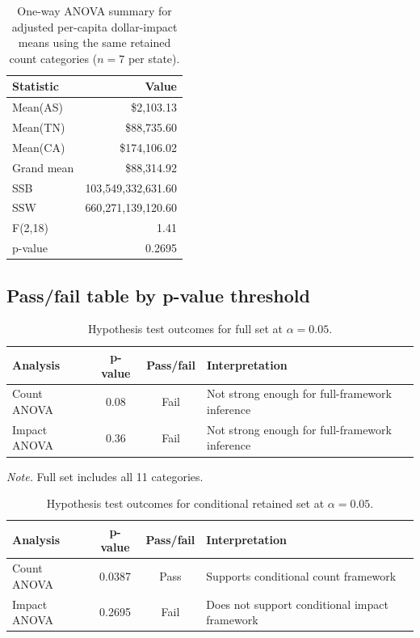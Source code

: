 \begin{table}[H]
  \centering
  \caption{One-way ANOVA summary for adjusted per-capita dollar-impact means using the same retained count categories ($n=7$ per state).}
  \label{tab:conditional-impact-summary}
  \begin{tabular}{@{}lr@{}}
    \toprule
    Statistic & Value\\
    \midrule
    Mean(AS) & \$2{,}103.13\\
    Mean(TN) & \$88{,}735.60\\
    Mean(CA) & \$174{,}106.02\\
    Grand mean & \$88{,}314.92\\
    SSB & 103{,}549{,}332{,}631.60\\
    SSW & 660{,}271{,}139{,}120.60\\
    F(2,18) & 1.41\\
    p-value & 0.2695\\
    \bottomrule
  \end{tabular}
\end{table}

\subsection{Pass/fail table by p-value threshold}

\begin{table}[H]
  \centering
  \caption{Hypothesis test outcomes for full set at $\alpha=0.05$.}
  \label{tab:conditional-pass-fail-full}
  \small
  \begin{tabular}{@{}lccl@{}}
    \toprule
    Analysis & p-value & Pass/fail & Interpretation\\
    \midrule
    Count ANOVA & 0.08 & Fail & Not strong enough for full-framework inference\\
    Impact ANOVA & 0.36 & Fail & Not strong enough for full-framework inference\\
    \bottomrule
  \end{tabular}
\end{table}

\noindent\textit{Note.} Full set includes all 11 categories.

\begin{table}[H]
  \centering
  \caption{Hypothesis test outcomes for conditional retained set at $\alpha=0.05$.}
  \label{tab:conditional-pass-fail-retained}
  \small
  \begin{tabular}{@{}lccl@{}}
    \toprule
    Analysis & p-value & Pass/fail & Interpretation\\
    \midrule
    Count ANOVA & 0.0387 & Pass & Supports conditional count framework\\
    Impact ANOVA & 0.2695 & Fail & Does not support conditional impact framework\\
    \bottomrule
  \end{tabular}
\end{table}

